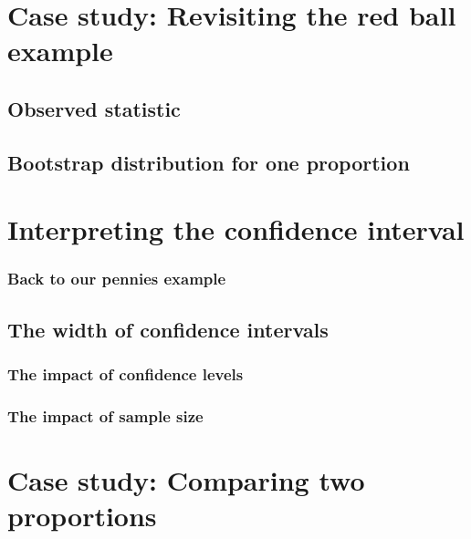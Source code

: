 \documentclass[
  12pt, krantz2,
]{krantz}
\begin{document}
\hypertarget{one-prop-ci}{%
\section{Case study: Revisiting the red ball example}\label{one-prop-ci}}

\hypertarget{observed-statistic}{%
\subsection{Observed statistic}\label{observed-statistic}}

\hypertarget{one-prop-boot}{%
\subsection{Bootstrap distribution for one proportion}\label{one-prop-boot}}

\hypertarget{interpreting-the-confidence-interval}{%
\section{Interpreting the confidence interval}\label{interpreting-the-confidence-interval}}

\hypertarget{back-to-our-pennies-example}{%
\subsubsection*{Back to our pennies example}\label{back-to-our-pennies-example}}


\hypertarget{the-width-of-confidence-intervals}{%
\subsection*{The width of confidence intervals}\label{the-width-of-confidence-intervals}}


\hypertarget{the-impact-of-confidence-levels}{%
\subsubsection*{The impact of confidence levels}\label{the-impact-of-confidence-levels}}


\hypertarget{the-impact-of-sample-size}{%
\subsubsection*{The impact of sample size}\label{the-impact-of-sample-size}}


\hypertarget{case-study-two-prop-ci}{%
\section{Case study: Comparing two proportions}\label{case-study-two-prop-ci}}
\end{document}
